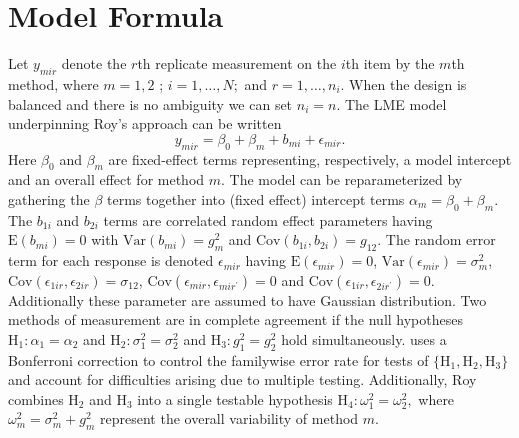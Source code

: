 \documentclass[12pt, a4paper]{report}
\theoremstyle{plain}
\theoremstyle{definition}
\theoremstyle{remark}
\begin{document}
\section{Model Formula}
Let $y_{mir} $ denote the $r$th replicate measurement on the $i$th item by the $m$th method, where $m=1,2$ ; $i=1,\ldots,N;$ and $r = 1,\ldots,n_i.$ When the design is balanced and there is no ambiguity we can set $n_i=n.$ The LME model underpinning Roy's approach can be written
\begin{equation}\label{Roy-model}
y_{mir} = \beta_{0} + \beta_{m} + b_{mi} + \epsilon_{mir}.
\end{equation}
Here $\beta_0$ and $\beta_m$ are fixed-effect terms representing, respectively, a model intercept and an overall effect for method $m.$ The model can be reparameterized by gathering the $\beta$ terms together into (fixed effect) intercept terms $\alpha_m=\beta_0+\beta_m.$ The $b_{1i}$ and $b_{2i}$ terms are correlated random effect parameters having $\mathrm{E}(b_{mi})=0$ with $\mathrm{Var}(b_{mi})=g^2_m$ and $\mathrm{Cov}(b_{1i}, b_{2 i})=g_{12}.$ The random error term for each response is denoted $\epsilon_{mir}$ having $\mathrm{E}(\epsilon_{mir})=0$, $\mathrm{Var}(\epsilon_{mir})=\sigma^2_m$, $\mathrm{Cov}(\epsilon_{1ir}, \epsilon_{2 ir})=\sigma_{12}$, $\mathrm{Cov}(\epsilon_{mir}, \epsilon_{mir^\prime})= 0$ and $\mathrm{Cov}(\epsilon_{1ir}, \epsilon_{2 ir^\prime})= 0.$ Additionally these parameter are assumed to have Gaussian distribution. Two methods of measurement are in complete agreement if the null hypotheses $\mathrm{H}_1\colon \alpha_1 = \alpha_2$ and $\mathrm{H}_2\colon \sigma^2_1 = \sigma^2_2 $ and $\mathrm{H}_3\colon g^2_1= g^2_2$ hold simultaneously. \citet{roy} uses a Bonferroni correction to control the familywise error rate for tests of $\{\mathrm{H}_1, \mathrm{H}_2, \mathrm{H}_3\}$ and account for difficulties arising due to multiple testing. Additionally, Roy combines $\mathrm{H}_2$ and $\mathrm{H}_3$ into a single testable hypothesis $\mathrm{H}_4\colon \omega^2_1=\omega^2_2,$ where $\omega^2_m = \sigma^2_m + g^2_m$ represent the overall variability of method $m.$


\newpage
\end{document}
